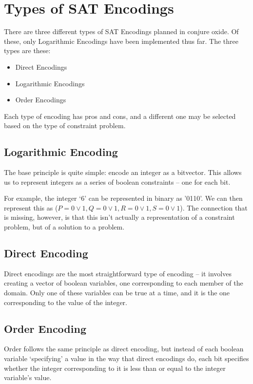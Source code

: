 \section{Types of SAT Encodings}

There are three different types of SAT Encodings planned in conjure oxide. Of these, only Logarithmic Encodings have been implemented thus far. The three types are these:

\begin{itemize}
    \item Direct Encodings
    \item Logarithmic Encodings
    \item Order Encodings
\end{itemize}

Each type of encoding has pros and cons, and a different one may be selected based on the type of constraint problem.

\subsection{Logarithmic Encoding}

The base principle is quite simple: encode an integer as a bitvector. This allows us to represent integers as a series of boolean constraints -- one for each bit. 

For example, the integer `6' can be represented in binary as '0110'. We can then represent this as ($P = 0\lor1, Q = {0\lor1}, R = {0\lor1}, S = {0\lor1}$). The connection that is missing, however, is that this isn't actually a representation of a constraint problem, but of a solution to a problem.  

\subsection{Direct Encoding}

Direct encodings are the most straightforward type of encoding -- it involves creating a vector of boolean variables, one corresponding to each member of the domain. Only one of these variables can be true at a time, and it is the one corresponding to the value of the integer. 

\subsection{Order Encoding}

Order follows the same principle as direct encoding, but instead of each boolean variable `specifying' a value in the way that direct encodings do, each bit specifies whether the integer corresponding to it is less than or equal to the integer variable's value.

